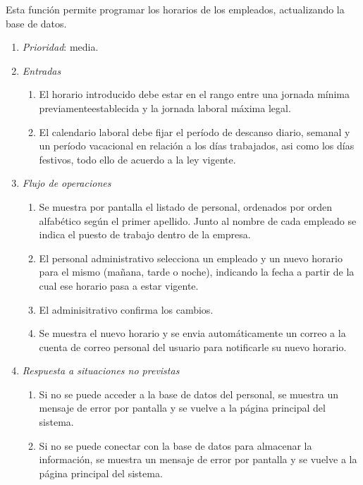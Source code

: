 
	Esta función permite programar los horarios de los empleados, actualizando la base de datos.

	\begin{enumerate}
		\item \textit{Prioridad}: media.
		\item \textit{Entradas}
		\begin{enumerate}
			\item El horario introducido debe estar en el rango entre una jornada mínima previamente\break establecida y la jornada laboral máxima legal.
			\item El calendario laboral debe fijar el período de descanso diario, semanal y un período vacacional en relación a los días trabajados, asi como los días festivos, todo ello de acuerdo a la ley vigente.
		\end{enumerate}
		\item \textit{Flujo de operaciones}
		\begin{enumerate}
			\item Se muestra por pantalla el listado de personal, ordenados por orden alfabético según el primer apellido. Junto al nombre de cada empleado se indica el puesto de trabajo dentro de la empresa.
			\item El personal administrativo selecciona un empleado y un nuevo horario para el mismo (mañana, tarde o noche), indicando la fecha a partir de la cual ese horario pasa a estar vigente. 
			\item El adminisitrativo confirma los cambios.
			\item Se muestra el nuevo horario y se envia automáticamente un correo a la cuenta de correo personal del usuario para notificarle su nuevo horario.
		\end{enumerate}
		\item \textit{Respuesta a situaciones no previstas}
		\begin{enumerate}
			\item Si no se puede acceder a la base de datos del personal, se muestra un mensaje de error por pantalla y se vuelve a la página principal del sistema.
			\item Si no se puede conectar con la base de datos para almacenar la información, se muestra un mensaje de error por pantalla y se vuelve a la página principal del sistema.
		\end{enumerate}
	\end{enumerate}
